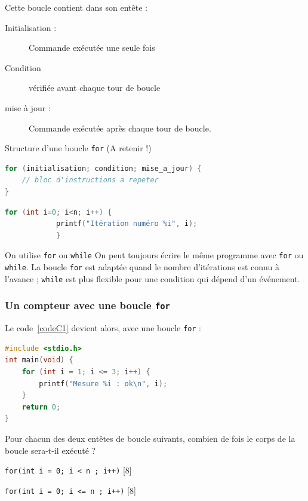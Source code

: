 Cette boucle contient dans son entête :
\begin{description}
  \item[Initialisation :] Commande exécutée une seule fois
  \item[Condition] vérifiée avant chaque tour de boucle
  \item[mise à jour :] Commande exécutée après chaque tour de boucle.
\end{description}

\begin{UPSTIinfor}{Structure d'une boucle \texttt{for} (A retenir !)}
  \begin{minipage}{.48\textwidth}
        \begin{lstlisting}[language=c, caption={Structure d'une boucle \texttt{for}}]
for (initialisation; condition; mise_a_jour) {
    // bloc d'instructions a repeter
}
\end{lstlisting}
  \end{minipage}\hfill
  \begin{minipage}{.48\textwidth}
    \begin{lstlisting}[language=c, caption={Exemple de boucle \texttt{for}}]
        for (int i=0; i<n; i++) {
            printf("Itération numéro %i", i);
            }
        \end{lstlisting}
  \end{minipage}
\end{UPSTIinfor}

\begin{UPSTIinfor}{On utilise \texttt{for} ou \texttt{while}}
  On peut toujours écrire le même programme avec \texttt{for} ou \texttt{while}. La boucle \texttt{for} est adaptée quand le nombre d'itérations est connu à l'avance ; \texttt{while} est plus flexible pour une condition qui dépend d'un événement.
\end{UPSTIinfor}
\subsubsection{Un compteur avec une boucle \texttt{for}}
Le code~\ref{codeC1} devient alors, avec une boucle \texttt{for} :
    \begin{lstlisting}[language=c,caption={Comtage de mesures avec une boucle \texttt{for>}}]
#include <stdio.h>
int main(void) {
    for (int i = 1; i <= 3; i++) {
        printf("Mesure %i : ok\n", i);
    }
    return 0;
}
\end{lstlisting}
\begin{UPSTIactivite}
  Pour chacun des deux entêtes de boucle suivants, combien de fois le corps de la boucle sera-t-il exécuté ?\\

  \begin{minipage}{.48\textwidth}
\texttt{for(int i = 0; i < n ; i++)}
[8]
  \end{minipage}\hfill
  \begin{minipage}{.48\textwidth}
\texttt{for(int i = 0; i <= n ; i++)}
[8]
  \end{minipage}
\end{UPSTIactivite}
